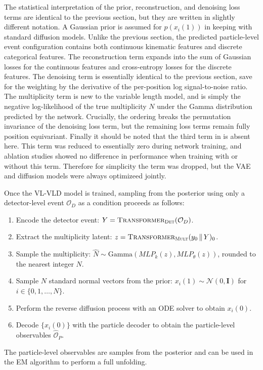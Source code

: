 The statistical interpretation of the prior, reconstruction, and denoising loss terms are identical to the previous section, but they are written in slightly different notation.
A Gaussian prior is assumed for $p(x_i(1))$ in keeping with standard diffusion models.
Unlike the previous section, the predicted particle-level event configuration contains both continuous kinematic features and discrete categorical features.
The reconstruction term expands into the sum of Gaussian losses for the continuous features and cross-entropy losses for the discrete features.
The denoising term is essentially identical to the previous section, save for the weighting by the derivative of the per-position log signal-to-noise ratio.
The multiplicity term is new to the variable length model, and is simply the negative log-likelihood of the true multiplicity $N$ under the Gamma distribution predicted by the network.
Crucially, the \pt ordering breaks the permutation invariance of the denoising loss term, but the remaining loss terms remain fully position equivariant.
Finally it should be noted that the third term in  is absent here.
This term was reduced to essentially zero during network training, and ablation studies showed no difference in performance when training with or without this term.
Therefore for simplicity the term was dropped, but the VAE and diffusion models were always optimizeed jointly.

Once the VL-VLD model is trained, sampling from the posterior using only a detector-level event $\mathcal{O}_D$ as a condition proceeds as follows:
\begin{enumerate}
  \item Encode the detector event: $Y = \textsc{Transformer}_\textsc{Det}(\mathcal{O}_D)$.
  \item Extract the multiplicity latent: $z = \textsc{Transformer}_\textsc{Mult}(y_0 \,\|\, Y)_0$.
  \item Sample the multiplicity: $\hat{N} \sim \mathrm{Gamma}(MLP_k(z), MLP_\theta(z))$, rounded to the nearest integer $N$.
  \item Sample $N$ standard normal vectors from the prior: $x_i(1) \sim \mathcal{N}(0, \mathbf{I})$ for $i \in \{0, 1, \ldots, N\}$.
  \item Perform the reverse diffusion process with an ODE solver to obtain $x_i(0)$.
  \item Decode $\{x_i(0)\}$ with the particle decoder to obtain the particle-level observables $\hat{\mathcal{O}}_P$.
\end{enumerate}
The particle-level observables are samples from the posterior and can be used in the EM algorithm to perform a full unfolding.

